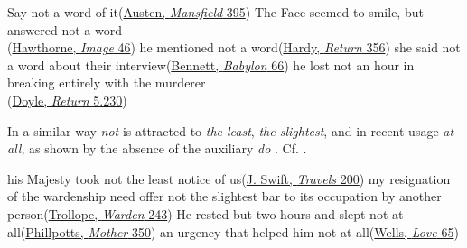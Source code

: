 \ea \label{ex:05-60}
\ea
Say not a word of it\hfill(\href{https://archive.org/details/mansfieldpark00aust_1/page/364/mode/2up?q=%22say+not+a+word%22&view=theater}{Austen, \textit{Mansfield} 395})
\ex
The Face seemed to smile, but answered not a word\\\hfill(\href{https://archive.org/details/snowimageothertw0000hawt/page/44/mode/2up?q=%22face+seemed+to+smile%22&view=theater}{Hawthorne, \textit{Image} 46}) %
\ex
he mentioned not a word\hfill(\href{https://archive.org/details/returnofthenativ00harduoft/page/270/mode/2up?q=%22he+mentioned+not%22&view=theater}{Hardy, \textit{Return} 356})
\ex
she said not a word about their interview\hfill(\href{https://archive.org/details/grandbabylonhote00bennuoft/page/82/mode/2up?view=theater&q=%22said+not+a+word%22}{Bennett, \textit{Babylon} 66}) %
\ex
he lost not an hour in breaking entirely with the murderer\\\hfill(\href{https://archive.org/details/returnofsherlock0000acon/page/152/mode/2up?view=theater&q=%22lost+not+an+hour%22}{Doyle, \textit{Return} 5.230}) %
\z
\z{}

In a similar way \textit{not} is attracted to \textit{the least}, \textit{the slightest}, and in recent usage \textit{at all}, as shown by the absence of the auxiliary \textit{do} . Cf. .

\ea \label{ex:05-65}
\ea
his Majesty took not the least notice of us\hfill(\href{https://archive.org/details/bim_eighteenth-century_the-works-of-j-s-dd-_swift-jonathan_1735_3/page/200/mode/2up?view=theater&q=%22Maje%C5%BFty+took+not+the+lea%C5%BFt+Notice%22}{J. Swift, \textit{Travels} 200}) %
\ex
my resignation of the wardenship need offer not the slightest bar to its occupation by another person\hfill(\href{https://archive.org/details/warden0000anth_w6p5/page/228/mode/2up?q=%22need+offer+not%22&view=theater}{Trollope, \textit{Warden} 243})
\ex
He rested but two hours and slept not at all\hfill(\href{https://archive.org/details/themother00phil/page/350/mode/2up?q=%22but+two+hours%22&view=theater}{Phillpotts, \textit{Mother} 350}) %
\ex
an urgency that helped him not at all\hfill(\href{https://archive.org/details/loveandmrlewisha00welluoft/page/64/mode/2up?view=theater&q=%22urgency+that+helped%22}{Wells, \textit{Love} 65})

